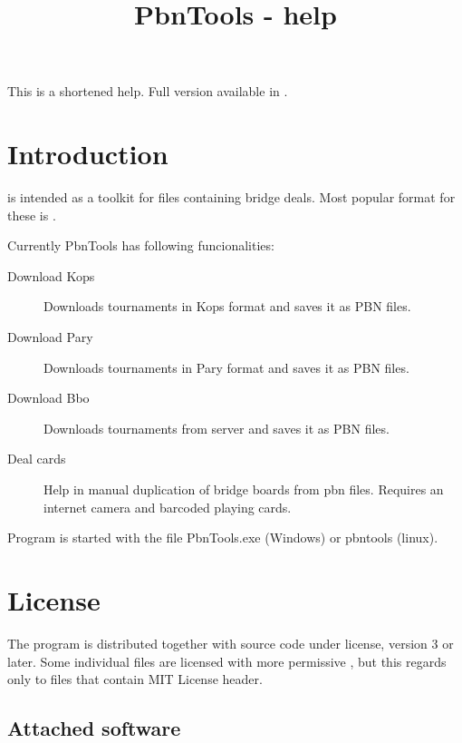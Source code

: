 \documentclass[polish,a4paper,11pt,oneside]{article}
\begin{document}
\title{PbnTools - help}
\author{\null}
\date{\null}


\maketitle

This is a shortened help. Full version available in .

\tableofcontents

\section{Introduction}
 is intended as a toolkit for files containing bridge deals.
Most popular format for these is .

Currently PbnTools has following funcionalities:

\begin{description}
\item[Download Kops]
  Downloads tournaments in Kops format and saves it as PBN files.
\item[Download Pary]
  Downloads tournaments in Pary format and saves it as PBN files.
\item[Download Bbo]
  Downloads tournaments from \bbolink
  server and saves it as PBN files.
\item[Deal cards]
  Help in manual duplication of bridge boards from pbn files.
  Requires an internet camera and barcoded playing cards.
\end{description}

Program is started with the file PbnTools.exe (Windows) or pbntools (linux).

\section{License}
The program is distributed together with source code
under  license,
version 3 or later.
Some individual files are licensed with more permissive
,
but this regards only to files that contain MIT License header.

\subsection{Attached software}
\end{document}
